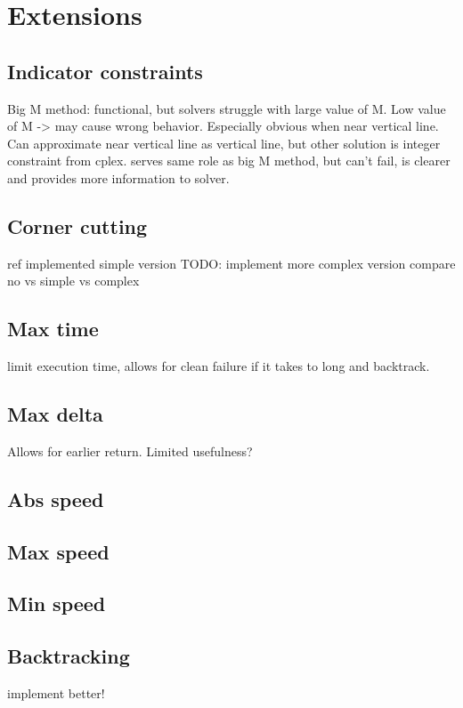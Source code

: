 \section{Extensions}
\label{section:extensions}

\subsection{Indicator constraints}
Big M method: functional, but solvers struggle with large value of M. Low value of M -> may cause wrong behavior. Especially obvious when near vertical line. \\
Can approximate near vertical line as vertical line, but other solution is integer constraint from cplex. serves same role as big M method, but can't fail, is clearer and provides more information to solver.

\subsection{Corner cutting}
ref \cite{Richards2015}
implemented simple version
TODO: implement more complex version
compare no vs simple vs complex

\subsection{Max time}
limit execution time, allows for clean failure if it takes to long and backtrack.
\subsection{Max delta}
Allows for earlier return. Limited usefulness?

\subsection{Abs speed}


\subsection{Max speed}

\subsection{Min speed}

\subsection{Backtracking}
implement better!
